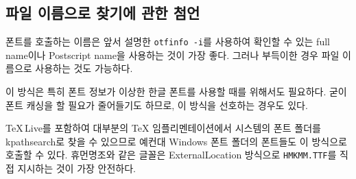 \documentclass[
	12pt,
	a4paper,
	kosection,
	footnote,
	nobookmarks,
	microtype,
]{oblivoir}
\def\util#1{\texttt{#1}}
\newcommand\xobclass{x\-ob\-liv\-oir\oblivoirallowbreak}
\begin{document}
\subsection{파일 이름으로 찾기에 관한 첨언}

폰트를 호출하는 이름은 앞서 설명한 \util{otfinfo -i}를 사용하여 확인할 수 있는
full name이나 Postscript name을 사용하는 것이 가장 좋다. 그러나 부득이한 경우 
파일 이름으로 사용하는 것도 가능하다.

이 방식은 특히 폰트 정보가 이상한 한글 폰트를 사용할 때를 위해서도
필요하다.
굳이 폰트 캐싱을 할 필요가 줄어들기도 하므로, 이 방식을 선호하는 경우도 있다.

\TeX\,Live를 포함하여 대부분의 \TeX{} 임플리멘테이션에서 시스템의 폰트 폴더를 kpathsearch로
찾을 수 있으므로 예컨대 Windows 폰트 폴더의 폰트들도 이 방식으로 호출할 수 있다.
휴먼명조와 같은 글꼴은 ExternalLocation 방식으로 \verb|HMKMM.TTF|를 
직접 지시하는 것이 가장 안전하다.
\end{document}
